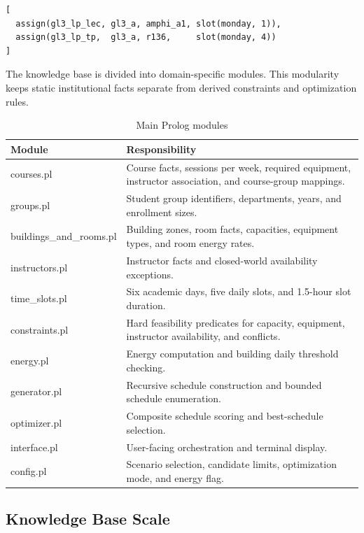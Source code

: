 \documentclass[12pt,a4paper]{article}
\begin{document}
\begin{lstlisting}[caption={Schedule as a recursive list of assignment terms}]
[
  assign(gl3_lp_lec, gl3_a, amphi_a1, slot(monday, 1)),
  assign(gl3_lp_tp,  gl3_a, r136,     slot(monday, 4))
]
\end{lstlisting}

The knowledge base is divided into domain-specific modules. This modularity keeps static institutional facts separate from derived constraints and optimization rules.

\begin{table}[h]
    \centering
    \caption{Main Prolog modules}
    \begin{tabularx}{\textwidth}{>{\ttfamily}lX}
        \toprule
        Module & Responsibility \\
        \midrule
        courses.pl & Course facts, sessions per week, required equipment, instructor association, and course-group mappings. \\
        groups.pl & Student group identifiers, departments, years, and enrollment sizes. \\
        buildings\_and\_rooms.pl & Building zones, room facts, capacities, equipment types, and room energy rates. \\
        instructors.pl & Instructor facts and closed-world availability exceptions. \\
        time\_slots.pl & Six academic days, five daily slots, and 1.5-hour slot duration. \\
        constraints.pl & Hard feasibility predicates for capacity, equipment, instructor availability, and conflicts. \\
        energy.pl & Energy computation and building daily threshold checking. \\
        generator.pl & Recursive schedule construction and bounded schedule enumeration. \\
        optimizer.pl & Composite schedule scoring and best-schedule selection. \\
        interface.pl & User-facing orchestration and terminal display. \\
        config.pl & Scenario selection, candidate limits, optimization mode, and energy flag. \\
        \bottomrule
    \end{tabularx}
\end{table}

\subsection{Knowledge Base Scale}
\end{document}
